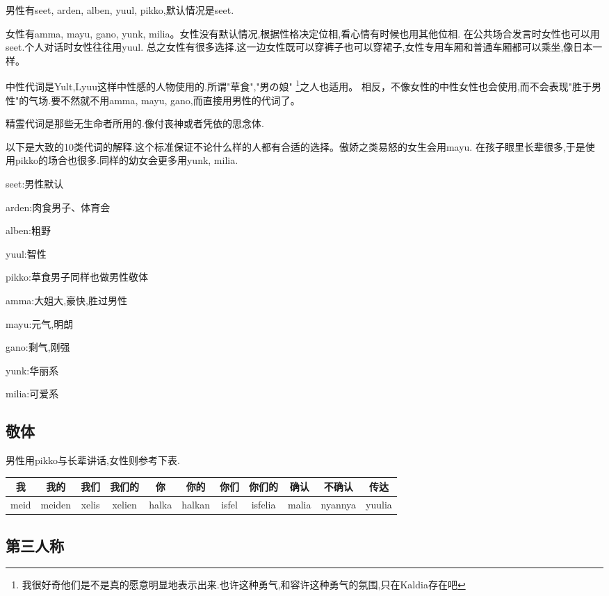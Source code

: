 男性有seet, arden, alben, yuul, pikko,默认情况是seet.

女性有amma, mayu, gano, yunk, milia。女性没有默认情况,根据性格决定位相,看心情有时候也用其他位相.
在公共场合发言时女性也可以用seet.个人对话时女性往往用yuul.
总之女性有很多选择.这一边女性既可以穿裤子也可以穿裙子,女性专用车厢和普通车厢都可以乘坐,像日本一样。

中性代词是Yult,Lyuu这样中性感的人物使用的.所谓"草食","男の娘"
\footnote{我很好奇他们是不是真的愿意明显地表示出来.也许这种勇气,和容许这种勇气的氛围,只在Kaldia存在吧}之人也适用。
相反，不像女性的中性女性也会使用,而不会表现"胜于男性"的气场.要不然就不用amma, mayu, gano,而直接用男性的代词了。

精霊代词是那些无生命者所用的.像付丧神或者凭依的思念体.

以下是大致的10类代词的解释.这个标准保证不论什么样的人都有合适的选择。傲娇之类易怒的女生会用mayu.
在孩子眼里长辈很多,于是使用pikko的场合也很多.同样的幼女会更多用yunk, milia.

seet:男性默认

arden:肉食男子、体育会

alben:粗野

yuul:智性

pikko:草食男子同样也做男性敬体

amma:大姐大,豪快,胜过男性

mayu:元气,明朗

gano:剩气,刚强

yunk:华丽系

milia:可爱系

\subsection{敬体}

男性用pikko与长辈讲话,女性则参考下表.
\begin{table}[H]
    \begin{tabular}{|c|c|c|c|c|c|c|c|c|c|c|} %
      \hline
      我&     我的&       我们&     我们的&     你&     你的&  你们&     你们的&     确认&  不确认&  传达\\\hline
      meid&   meiden&     xelis&  xelien&  halka&  halkan&  isfel&  isfelia&  malia&  nyannya&  yuulia\\\hline
  \end{tabular}
\end{table}

\subsection{第三人称}


